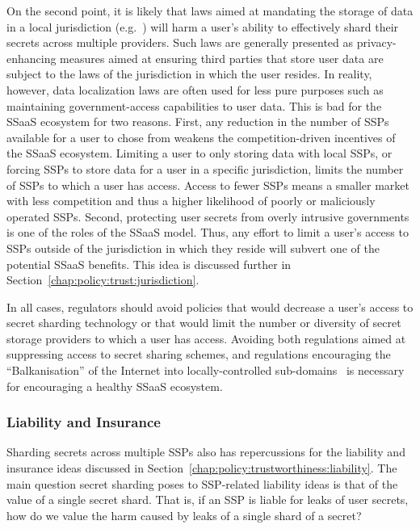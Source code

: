 On the second point, it is likely that laws aimed at mandating the
storage of data in a local jurisdiction (e.g.~\cite{dergacheva2015})
will harm a user's ability to effectively shard their secrets across
multiple providers. Such laws are generally presented as
privacy-enhancing measures aimed at ensuring third parties that store
user data are subject to the laws of the jurisdiction in which the
user resides. In reality, however, data localization laws are often
used for less pure purposes such as maintaining government-access
capabilities to user data. This is bad for the SSaaS ecosystem for two
reasons. First, any reduction in the number of SSPs available for a
user to chose from weakens the competition-driven incentives of the
SSaaS ecosystem. Limiting a user to only storing data with local SSPs,
or forcing SSPs to store data for a user in a specific jurisdiction,
limits the number of SSPs to which a user has access.  Access to fewer
SSPs means a smaller market with less competition and thus a higher
likelihood of poorly or maliciously operated SSPs. Second, protecting
user secrets from overly intrusive governments is one of the roles of
the SSaaS model. Thus, any effort to limit a user's access to SSPs
outside of the jurisdiction in which they reside will subvert one of
the potential SSaaS benefits. This idea is discussed further in
Section~\ref{chap:policy:trust:jurisdiction}.

In all cases, regulators should avoid policies that would decrease a
user's access to secret sharding technology or that would limit the
number or diversity of secret storage providers to which a user has
access. Avoiding both regulations aimed at suppressing access to
secret sharing schemes, and regulations encouraging the
``Balkanisation'' of the Internet into locally-controlled
sub-domains~\cite{lee2014} is necessary for encouraging a healthy
SSaaS ecosystem.

\subsubsection{Liability and Insurance}

Sharding secrets across multiple SSPs also has repercussions for the
liability and insurance ideas discussed in
Section~\ref{chap:policy:trustworthiness:liability}. The main question
secret sharding poses to SSP-related liability ideas is that of the
value of a single secret shard. That is, if an SSP is liable for leaks
of user secrets, how do we value the harm caused by leaks of a single
shard of a secret?

